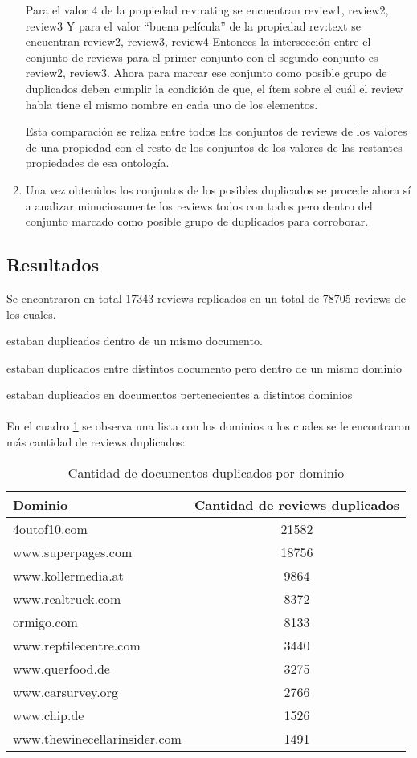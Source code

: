 \begin{enumerate}
Para el valor 4 de la propiedad rev:rating se encuentran {review1, review2, review3}
Y para el valor ``buena película'' de la propiedad rev:text se encuentran {review2, review3, review4}
Entonces la intersección entre el conjunto de reviews para el primer conjunto con el segundo conjunto es {review2, review3}.
Ahora para marcar ese conjunto como posible grupo de duplicados deben cumplir la condición de que, el ítem sobre el cuál el review habla
tiene el mismo nombre en cada uno de los elementos.

Esta comparación se reliza entre todos los conjuntos de reviews de los valores de una propiedad con el resto de los conjuntos de los valores de las restantes propiedades de esa ontología.

\item Una vez obtenidos los conjuntos de los posibles duplicados se procede ahora sí a analizar minuciosamente los reviews todos con todos pero dentro del conjunto marcado como posible grupo de duplicados
para corroborar.
\end{enumerate}

\subsection*{Resultados}

Se encontraron en total 17343 reviews replicados en un total de 78705 reviews de los cuales.

 estaban duplicados dentro de un mismo documento.

 estaban duplicados entre distintos documento pero dentro de un mismo dominio

 estaban duplicados en documentos pertenecientes a distintos dominios
\\\\
En el cuadro \ref{table:DominioDup} se observa una lista con los dominios a los cuales se le encontraron más cantidad de reviews duplicados:
\begin{table}[h]
\begin{tabular}{| l | c | }\hline
Dominio & Cantidad de reviews duplicados \\\hline
4outof10.com &	21582\\
www.superpages.com &	18756\\
www.kollermedia.at &	9864\\
www.realtruck.com &	8372\\
ormigo.com &	8133\\
www.reptilecentre.com &	3440\\
www.querfood.de &	3275\\
www.carsurvey.org &	2766\\
www.chip.de &	1526\\
www.thewinecellarinsider.com &	1491\\\hline
\end{tabular}
\caption{Cantidad de documentos duplicados por dominio}
\label{table:DominioDup}
\end{table}

